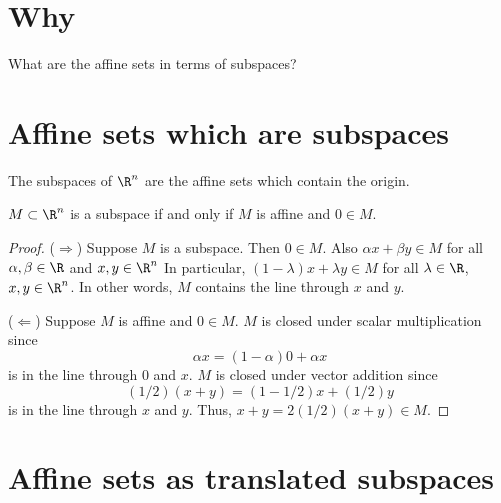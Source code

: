 
\section*{Why}

What are the affine sets in terms of subspaces?

\section*{Affine sets which are subspaces}

The subspaces of $\R ^n$ are the affine sets which contain the origin.

\begin{proposition}
$M \subset \R ^n$ is a subspace if and only if $M$ is affine and $0 \in M$.
\begin{proof}

($\Rightarrow$)
Suppose $M$ is a subspace.
Then $0 \in M$.
Also $\alpha x + \beta y \in M$ for all $\alpha , \beta  \in \R $ and $x, y \in \R ^n$
In particular, $(1- \lambda )x + \lambda y \in M$ for all $\lambda  \in \R $, $x, y \in \R ^n$.
In other words, $M$ contains the line through $x$ and $y$.

($\Leftarrow$) Suppose $M$ is affine and $0 \in M$.
$M$ is closed under scalar multiplication since
  \[
\alpha x = (1 - \alpha )0 + \alpha x
  \]
is in the line through $0$ and $x$.
$M$ is closed under vector addition since
  \[
(1/2)(x + y) = (1-1/2)x + (1/2)y
  \]
is in the line through $x$ and $y$.
Thus, $x+y = 2(1/2)(x+y) \in M$.
\end{proof}
\end{proposition}

\section*{Affine sets as translated subspaces}

